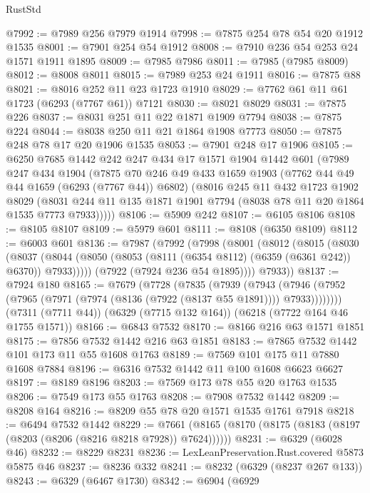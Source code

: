 \begin{lexlean}{RustStd}
\begin{coremodule}
{\begin{coremodule}
{{{{{{{{{{{{{{{{{{{{{{{{{{{{{{{{{{{@7992 := @7989 @256 @7979 @1914
@7998 := @7875 @254 @78 @54 @20 @1912 @1535
@8001 := @7901 @254 @54 @1912
@8008 := @7910 @236 @54 @253 @24 @1571 @1911 @1895
@8009 := @7985 @7986
@8011 := @7985 (@7985 @8009)
@8012 := @8008 @8011
@8015 := @7989 @253 @24 @1911
@8016 := @7875 @88
@8021 := @8016 @252 @11 @23 @1723 @1910
@8029 := @7762 @61 @11 @61 @1723 (@6293 (@7767 @61)) @7121
@8030 := @8021 @8029
@8031 := @7875 @226
@8037 := @8031 @251 @11 @22 @1871 @1909 @7794
@8038 := @7875 @224
@8044 := @8038 @250 @11 @21 @1864 @1908 @7773
@8050 := @7875 @248 @78 @17 @20 @1906 @1535
@8053 := @7901 @248 @17 @1906
@8105 := @6250
    @7685
    @1442
    @242
    @247
    @434
    @17
    @1571
    @1904
    @1442
    @601
    (@7989
      @247
      @434
      @1904
      (@7875
        @70
        @246
        @49
        @433
        @1659
        @1903
        (@7762 @44 @49 @44 @1659 (@6293 (@7767 @44)) @6802)
        (@8016
          @245
          @11
          @432
          @1723
          @1902
          @8029
          (@8031 @244 @11 @135 @1871 @1901 @7794 (@8038 @78 @11 @20 @1864 @1535 @7773 @7933)))))
@8106 := @5909 @242
@8107 := @6105 @8106
@8108 := @8105 @8107
@8109 := @5979 @601
@8111 := @8108 (@6350 @8109)
@8112 := @6003 @601
@8136 := @7987
    (@7992
      (@7998
        (@8001
          (@8012
            (@8015
              (@8030
                (@8037
                  (@8044 (@8050 (@8053 (@8111 (@6354 @8112) (@6359 (@6361 @242)) @6370)) @7933)))))
            (@7922 (@7924 @236 @54 @1895))))
        @7933))
@8137 := @7924 @180
@8165 := @7679
    (@7728
      (@7835
        (@7939
          (@7943 (@7946 (@7952 (@7965 (@7971 (@7974 (@8136 (@7922 (@8137 @55 @1891)))) @7933))))))))
    (@7311 (@7711 @44))
    (@6329 (@7715 @132 @164))
    (@6218 (@7722 @164 @46 @1755 @1571))
@8166 := @6843 @7532
@8170 := @8166 @216 @63 @1571 @1851
@8175 := @7856 @7532 @1442 @216 @63 @1851
@8183 := @7865 @7532 @1442 @101 @173 @11 @55 @1608 @1763
@8189 := @7569 @101 @175 @11 @7880 @1608 @7884
@8196 := @6316 @7532 @1442 @11 @100 @1608 @6623 @6627
@8197 := @8189 @8196
@8203 := @7569 @173 @78 @55 @20 @1763 @1535
@8206 := @7549 @173 @55 @1763
@8208 := @7908 @7532 @1442
@8209 := @8208 @164
@8216 := @8209 @55 @78 @20 @1571 @1535 @1761 @7918
@8218 := @6494 @7532 @1442
@8229 := @7661 (@8165 (@8170 (@8175 (@8183 (@8197 (@8203 (@8206 (@8216 @8218 @7928)) @7624))))))
@8231 := @6329 (@6028 @46)
@8232 := @8229 @8231
@8236 := LexLeanPreservation.Rust.covered @5873 @5875 @46
@8237 := @8236 @332
@8241 := @8232 (@6329 (@8237 @267 @133))
@8243 := @6329 (@6467 @1730)
@8342 := @6904
    (@6929
}}}}}}}}}}}}}}}}}}}}}}}}}}}}}}}}}}}
\end{coremodule}}
\end{coremodule}
\end{lexlean}
